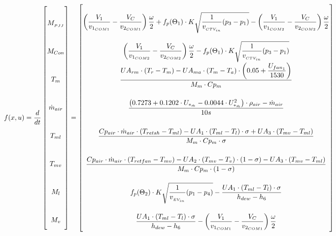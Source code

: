 \begin{equation} \label{eq:f_Sub} \renewcommand{\arraystretch}{3.4}
	f(x,u) =   \dfrac{d}{dt} \begin{bmatrix}
		M_{_{PJJ}}		\\				%
		M_{Con} 		\\				%
		T_m 			\\				%
		\dot{m}_{air}	\\				%
		T_{ml}			\\				%
		T_{mv}			\\				%
		M_l				\\				%
		M_v				\\				%
	\end{bmatrix}
	=
	\begin{bmatrix}
		\left(\dfrac{V_1}{v_{1_{COM1}}} - \dfrac{V_C}{v_{2_{COM1}}}\right) \dfrac{\omega}{2} + f_p(\Theta_1) \cdot K  \sqrt{\dfrac{1}{v_{_{CTV_{in}}}} (p_{3} - p_{1})} - \left(\dfrac{V_1}{v_{1_{COM2}}} - \dfrac{V_C}{v_{2_{COM2}}}\right) \dfrac{\omega}{2} \\										%
		\left(\dfrac{V_1}{v_{1_{COM2}}} - \dfrac{V_C}{v_{2_{COM2}}}\right) \dfrac{\omega}{2} - f_p(\Theta_1) \cdot K  \sqrt{\dfrac{1}{v_{_{CTV_{in}}}} (p_{3} - p_{1})}	\\												%
		\dfrac{U A_{rm} \cdot (T_r - T_m) - U A_{ma} \cdot (T_m - T_a)\cdot \left(0.05 + \dfrac{U_{fan_1}}{1530}\right)}{M_m \cdot Cp_m} \\									%
		\dfrac{\left( 0.7273 + 0.1202 \cdot U_{*_{\dot{m}}}  -0.0044 \cdot	U_{*_{\dot{m}}}^2 \right) \cdot \rho_{air}  - \dot{m}_{air}} {10s}		\\					%
		\dfrac{Cp_{air} \cdot \dot{m}_{air} \cdot (T_{retsh} - T_{ml})-U A_1 \cdot (T_{ml} - T_l) \cdot \sigma + U A_3 \cdot (T_{mv} - T_{ml})}{M_m \cdot Cp_m \cdot \sigma}        \\	%
		\dfrac{Cp_{air} \cdot \dot{m}_{air} \cdot (T_{retfan} - T_{mv}) - U A_2 \cdot (T_{mv} - T_v) \cdot (1- \sigma) - U A_3 \cdot (T_{mv} - T_{ml})}{M_m \cdot Cp_m \cdot (1- \sigma)}	\\	%
		f_p(\Theta_2) \cdot K  \sqrt{\dfrac{1}{v_{_{EV_{in}}}} (p_{1} - p_{4})} - \dfrac{U A_1 \cdot (T_{ml} - T_l) \cdot \sigma}{h_{dew} - h_{6}}		\\											%
		\dfrac{U A_1 \cdot (T_{ml} - T_l) \cdot \sigma}{h_{dew} - h_{6}} - \left(\dfrac{V_1}{v_{1_{COM1}}} - \dfrac{V_C}{v_{2_{COM1}}}\right) \dfrac{\omega}{2}	\\												%
	\end{bmatrix}
\end{equation}






